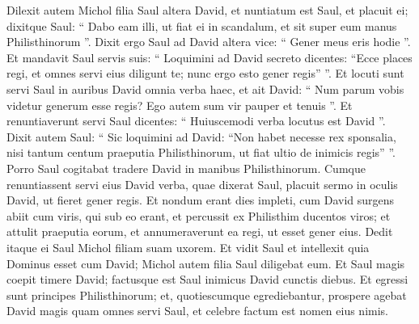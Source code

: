 \begin{biblechapter}
\begin{biblechapter}
\begin{biblechapter}
\begin{biblechapter}
\begin{biblechapter}
\begin{biblechapter}
\begin{biblechapter}
\begin{biblechapter}
\begin{biblechapter}
\begin{biblechapter}
\begin{biblechapter}
\begin{biblechapter}
\begin{biblechapter}
\begin{biblechapter}
\begin{biblechapter}
\begin{biblechapter}
\begin{biblechapter}
\begin{biblechapter}
 \verse Dilexit autem Michol filia Saul altera David, et nuntiatum est Saul, et placuit ei; 
\verse dixitque Saul: “ Dabo eam illi, ut fiat ei in scandalum, et sit super eum manus Philisthinorum ”. Dixit ergo Saul ad David altera vice: “ Gener meus eris hodie ”. 
\verse Et mandavit Saul servis suis: “ Loquimini ad David secreto dicentes: “Ecce places regi, et omnes servi eius diligunt te; nunc ergo esto gener regis” ”. 
\verse Et locuti sunt servi Saul in auribus David omnia verba haec, et ait David: “ Num parum vobis videtur generum esse regis? Ego autem sum vir pauper et tenuis ”. 
\verse Et renuntiaverunt servi Saul dicentes: “ Huiuscemodi verba locutus est David ”. 
\verse Dixit autem Saul: “ Sic loquimini ad David: “Non habet necesse rex sponsalia, nisi tantum centum praeputia Philisthinorum, ut fiat ultio de inimicis regis” ”. Porro Saul cogitabat tradere David in manibus Philisthinorum.
 \verse Cumque renuntiassent servi eius David verba, quae dixerat Saul, placuit sermo in oculis David, ut fieret gener regis. 
\verse Et nondum erant dies impleti, cum David surgens abiit cum viris, qui sub eo erant, et percussit ex Philisthim ducentos viros; et attulit praeputia eorum, et annumeraverunt ea regi, ut esset gener eius.
 Dedit itaque ei Saul Michol filiam suam uxorem. 
\verse Et vidit Saul et intellexit quia Dominus esset cum David; Michol autem filia Saul diligebat eum. 
 \verse Et Saul magis coepit timere David; factusque est Saul inimicus David cunctis diebus. 
\verse Et egressi sunt principes Philisthinorum; et, quotiescumque egrediebantur, prospere agebat David magis quam omnes servi Saul, et celebre factum est nomen eius nimis.
 

\end{biblechapter}
\end{biblechapter}
\end{biblechapter}
\end{biblechapter}
\end{biblechapter}
\end{biblechapter}
\end{biblechapter}
\end{biblechapter}
\end{biblechapter}
\end{biblechapter}
\end{biblechapter}
\end{biblechapter}
\end{biblechapter}
\end{biblechapter}
\end{biblechapter}
\end{biblechapter}
\end{biblechapter}
\end{biblechapter}
